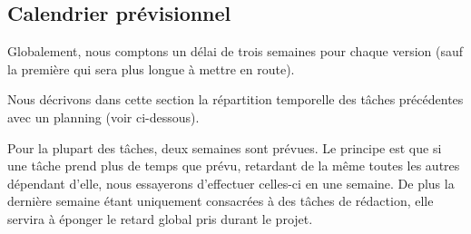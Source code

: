 \documentclass{article}
\begin{document}
\subsection{\label{calendrier}Calendrier prévisionnel}

Globalement, nous comptons un délai de trois semaines pour chaque version (sauf la première qui sera plus longue à mettre en route).

Nous décrivons dans cette section la répartition temporelle des tâches précédentes avec un planning (voir ci-dessous).

Pour la plupart des tâches, deux semaines sont prévues. Le principe est que si une tâche prend plus de temps que prévu, retardant de la même toutes les autres dépendant d'elle, nous essayerons d'effectuer celles-ci en une semaine. De plus la dernière semaine étant uniquement consacrées à des tâches de rédaction, elle servira à éponger le retard global pris durant le projet.

\newpage

\end{document}
